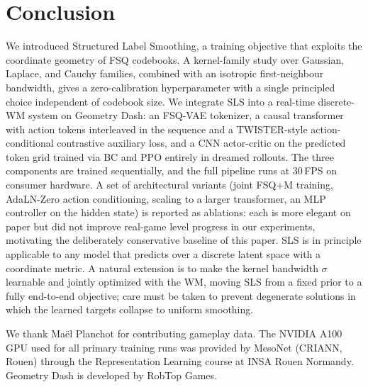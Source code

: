 \documentclass{article}
\begin{document}
\section{Conclusion}
\label{sec:conclusion}

We introduced Structured Label Smoothing, a training objective that exploits the coordinate geometry of FSQ codebooks.
A kernel-family study over Gaussian, Laplace, and Cauchy families, combined with an isotropic first-neighbour bandwidth, gives a zero-calibration hyperparameter with a single principled choice independent of codebook size.
We integrate SLS into a real-time discrete-WM system on Geometry Dash: an FSQ-VAE tokenizer, a causal transformer with action tokens interleaved in the sequence and a TWISTER-style action-conditional contrastive auxiliary loss, and a CNN actor-critic on the predicted token grid trained via BC and PPO entirely in dreamed rollouts.
The three components are trained sequentially, and the full pipeline runs at 30\,FPS on consumer hardware.
A set of architectural variants (joint FSQ+M training, AdaLN-Zero action conditioning, scaling to a larger transformer, an MLP controller on the hidden state) is reported as ablations: each is more elegant on paper but did not improve real-game level progress in our experiments, motivating the deliberately conservative baseline of this paper.
SLS is in principle applicable to any model that predicts over a discrete latent space with a coordinate metric.
A natural extension is to make the kernel bandwidth $\sigma$ learnable and jointly optimized with the WM, moving SLS from a fixed prior to a fully end-to-end objective; care must be taken to prevent degenerate solutions in which the learned targets collapse to uniform smoothing.

\begin{ack}
  We thank Ma{\"e}l Planchot for contributing gameplay data.
  The NVIDIA A100 GPU used for all primary training runs was provided by MesoNet (CRIANN, Rouen) through the Representation Learning course at INSA Rouen Normandy.
  Geometry Dash is developed by RobTop Games.
\end{ack}





\appendix



\newpage

\end{document}
